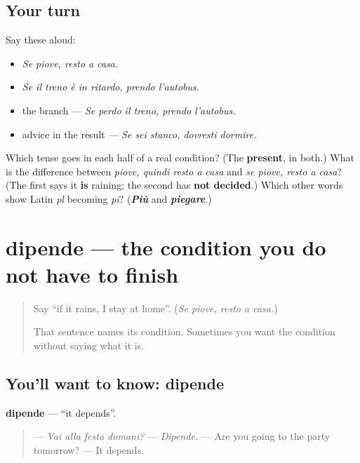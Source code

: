 \subsection*{Your turn}
Say these aloud:

\begin{itemize}
\raggedright
  \item \emph{Se piove, resto a casa.}
  \item \emph{Se il treno è in ritardo, prendo l'autobus.}
  \item the branch — \emph{Se perdo il treno, prendo l'autobus.}
  \item advice in the result — \emph{Se sei stanco, dovresti dormire.}
\end{itemize}

\begin{tcolorbox}[breakable,colback=teal!4,colframe=teal!35!black,title={Before you move on}]
Which tense goes in each half of a real condition? (The \textbf{present}, in both.) What is the difference between \emph{piove, quindi resto a casa} and \emph{se piove, resto a casa}? (The first says it \textbf{is} raining; the second has \textbf{not decided}.) Which other words show Latin \emph{pl} becoming \emph{pi}? (\emph{\textbf{Più}} and \emph{\textbf{piegare}}.)
\end{tcolorbox}
\section[dipende]{dipende — the condition you do not have to finish}

\label{lesson:IT-C271-dipende}



\begin{quote}
Say \textquotedblleft{}if it rains, I stay at home\textquotedblright{}. (\emph{Se piove, resto a casa.})

That sentence names its condition. Sometimes you want the condition without saying what it is.
\end{quote}

\subsection*{You'll want to know: dipende}
\textbf{dipende} — \textquotedblleft{}it depends\textquotedblright{}.

\begin{quote}
— \emph{Vai alla festa domani?} — \emph{Dipende.} — Are you going to the party tomorrow? — It depends.
\end{quote}


